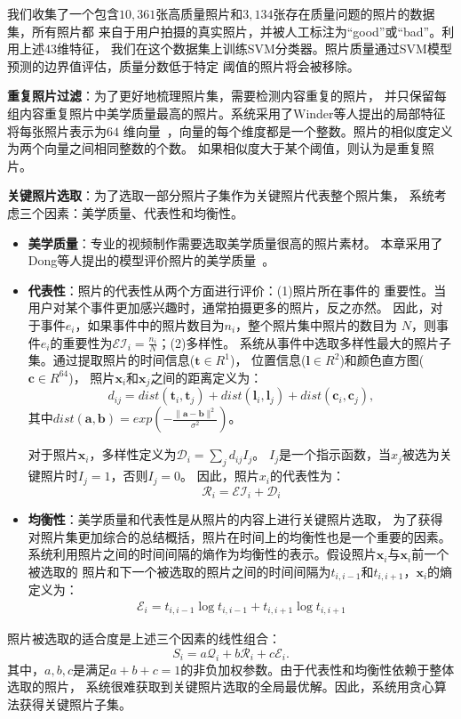 \documentclass[doctor]{ustcthesis}
\def \a {\mathbf{a}}
\def \b {\mathbf{b}}
\def \c {\mathbf{c}} \def \f    {\mathbf{f}}
\def \l  {\mathbf{l}}
\def \t {\mathbf{t}}
\def \x {\mathbf{x}}
\begin{document}
我们收集了一个包含$10,361$张高质量照片和$3,134$张存在质量问题的照片的数据集，所有照片都
来自于用户拍摄的真实照片，并被人工标注为``good''或``bad''。利用上述43维特征，
我们在这个数据集上训练SVM分类器。照片质量通过SVM模型预测的边界值评估，质量分数低于特定
阈值的照片将会被移除。

\textbf{重复照片过滤}：为了更好地梳理照片集，需要检测内容重复的照片，
并只保留每组内容重复照片中美学质量最高的照片。系统采用了Winder等人提出的局部特征将每张照片表示为$64$
维向量~\cite{t2s2}，向量的每个维度都是一个整数。照片的相似度定义为两个向量之间相同整数的个数。
如果相似度大于某个阈值，则认为是重复照片。

\textbf{关键照片选取}：为了选取一部分照片子集作为关键照片代表整个照片集，
系统考虑三个因素：美学质量、代表性和均衡性。
\vspace{-0.5em}
\begin{itemize}
    \item \textbf{美学质量}：专业的视频制作需要选取美学质量很高的照片素材。
        本章采用了Dong等人提出的模型评价照片的美学质量~\cite{dong2014eepqa}。
    \item \textbf{代表性}：照片的代表性从两个方面进行评价：(1)照片所在事件的
        重要性。当用户对某个事件更加感兴趣时，通常拍摄更多的照片，反之亦然。
        因此，对于事件$e_i$，如果事件中的照片数目为$n_i$，整个照片集中照片的数目为
        $N$，则事件$e_i$的重要性为$\mathcal{EI}_i=\frac{n_i}{N}$；(2)多样性。
        系统从事件中选取多样性最大的照片子集。通过提取照片的时间信息($\t \in
        R^1$)， 位置信息($\l \in R^2$)和颜色直方图($\c\in R^{64}$)，
        照片$\x_i$和$\x_j$之间的距离定义为：
        \begin{equation}
            d_{ij} = dist(\t_i, \t_j) + dist(\l_i, \l_j) + dist(\c_i, \c_j),
        \end{equation}
        其中$dist(\a,\b)=exp(-\frac{\|\a-\b\|^2}{\sigma^2})$。

        对于照片$\x_i$，多样性定义为$\mathcal{D}_i = \sum_j d_{ij}I_{j}$。
        $I_j$是一个指示函数，当$x_j$被选为关键照片时$I_j=1$，否则$I_j=0$。
        因此，照片$x_i$的代表性为：
        \begin{equation}
            \mathcal{R}_i=\mathcal{EI}_i + \mathcal{D}_i
        \end{equation}
    \item \textbf{均衡性}：美学质量和代表性是从照片的内容上进行关键照片选取，
        为了获得对照片集更加综合的总结概括，照片在时间上的均衡性也是一个重要的因素。
        系统利用照片之间的时间间隔的熵作为均衡性的表示。假设照片$\x_i$与$\x_i$前一个被选取的
        照片和下一个被选取的照片之间的时间间隔为$t_{i,i-1}$和$t_{i,i+1}$，$\x_i$的熵定义为：
        \begin{eqnarray}
            \mathcal{E}_i=t_{i,i-1}\log t_{i,i-1} + t_{i,i+1}\log t_{i,i+1}
        \end{eqnarray}
\end{itemize}
照片被选取的适合度是上述三个因素的线性组合：
\begin{equation}
    S_i = a \mathcal{Q}_i + b \mathcal{R}_i + c \mathcal{E}_i.
\end{equation}
其中，$a,b,c$是满足$a+b+c=1$的非负加权参数。由于代表性和均衡性依赖于整体选取的照片，
系统很难获取到关键照片选取的全局最优解。因此，系统用贪心算法获得关键照片子集。
\end{document}
